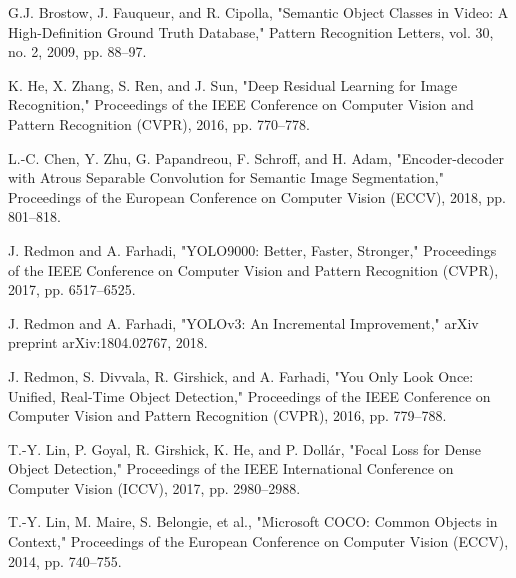 \documentclass[conference]{IEEEtran}
\begin{document}
\begin{thebibliography}{00}

 G.J. Brostow, J. Fauqueur, and R. Cipolla, "Semantic Object Classes in Video: A High-Definition Ground Truth Database," Pattern Recognition Letters, vol. 30, no. 2, 2009, pp. 88–97.


 K. He, X. Zhang, S. Ren, and J. Sun, "Deep Residual Learning for Image Recognition," Proceedings of the IEEE Conference on Computer Vision and Pattern Recognition (CVPR), 2016, pp. 770–778.


 L.-C. Chen, Y. Zhu, G. Papandreou, F. Schroff, and H. Adam, "Encoder-decoder with Atrous Separable Convolution for Semantic Image Segmentation," Proceedings of the European Conference on Computer Vision (ECCV), 2018, pp. 801–818.


 J. Redmon and A. Farhadi, "YOLO9000: Better, Faster, Stronger," Proceedings of the IEEE Conference on Computer Vision and Pattern Recognition (CVPR), 2017, pp. 6517–6525.

 J. Redmon and A. Farhadi, "YOLOv3: An Incremental Improvement," arXiv preprint arXiv:1804.02767, 2018.

 J. Redmon, S. Divvala, R. Girshick, and A. Farhadi, "You Only Look Once: Unified, Real-Time Object Detection," Proceedings of the IEEE Conference on Computer Vision and Pattern Recognition (CVPR), 2016, pp. 779–788.


 T.-Y. Lin, P. Goyal, R. Girshick, K. He, and P. Dollár, "Focal Loss for Dense Object Detection," Proceedings of the IEEE International Conference on Computer Vision (ICCV), 2017, pp. 2980–2988.


 T.-Y. Lin, M. Maire, S. Belongie, et al., "Microsoft COCO: Common Objects in Context," Proceedings of the European Conference on Computer Vision (ECCV), 2014, pp. 740–755.


\end{thebibliography}
\end{document}
